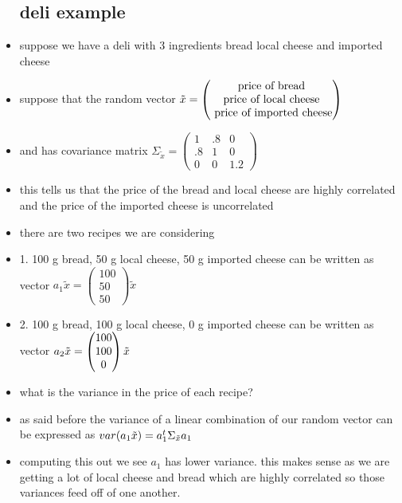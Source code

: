 \documentclass{article}
\begin{document}
\begin{itemize}
\subsection*{deli example}
\item suppose we have a deli with 3 ingredients bread local cheese and imported cheese
\item suppose that the random vector $\Tilde{x}=\begin{pmatrix}
    \text{price of bread}
    \\ \text{price of local cheese}\\
    \text{ price of imported cheese}
\end{pmatrix}$ 
\item and has covariance matrix $\Sigma_{\tilde{x}}=\begin{pmatrix}
    1&.8&0\\.8&1&0\\0&0&1.2
\end{pmatrix}$
\item this tells us that the price of the bread and local cheese are highly correlated and the price of the imported cheese is uncorrelated
\item there are two recipes we are considering
\item 1. 100 g bread, 50 g local cheese, 50 g imported cheese can be written as vector $a_1\tilde{x}=\begin{pmatrix}
    100\\50\\50
\end{pmatrix}\tilde{x}$ 
\item 2. 100 g bread, 100 g local cheese, 0 g imported cheese can be written as vector $a_2\Tilde{x}=\begin{pmatrix}
    100\\100\\0
\end{pmatrix}\Tilde{x}$ 
\item what is the variance in the price of each recipe?
\item as said before the variance of a linear combination of our random vector can be expressed as $var(a_1\tilde{x})=a_1^{t}\Sigma_{\Tilde{x}}a_1$
\item computing this out we see $a_1$ has lower variance. this makes sense as we are getting a lot of local cheese and bread which are highly correlated so those variances feed off of one another.  

\end{itemize}
\end{document}
